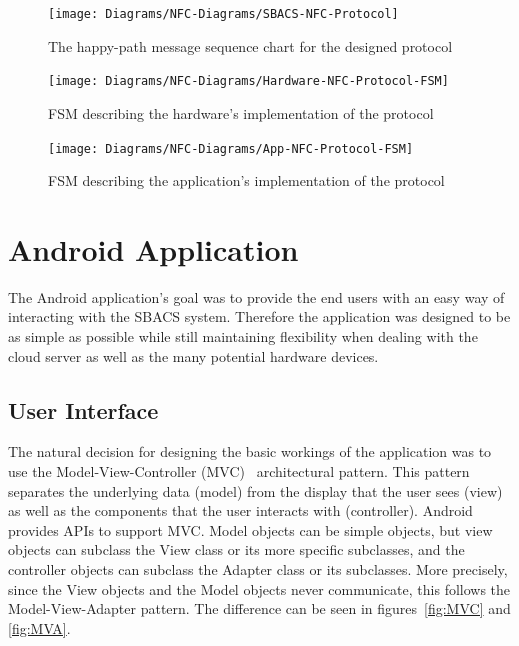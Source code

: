 \documentclass[12pt]{report}
\let\Oldsection\section
\renewcommand{\section}{\FloatBarrier\Oldsection}
\let\Oldsubsection\subsection
\renewcommand{\subsection}{\FloatBarrier\Oldsubsection}
\begin{document}
\begin{figure}
    \centering
    \texttt{[image: Diagrams/NFC-Diagrams/SBACS-NFC-Protocol]}
    \caption{The happy-path message sequence chart for the designed protocol}
    \label{fig:nfc-protocol-msc}
\end{figure}

\begin{figure}
    \texttt{[image: Diagrams/NFC-Diagrams/Hardware-NFC-Protocol-FSM]}
    \caption{FSM describing the hardware's implementation of the protocol}
    \label{fig:nfc-protocol-fsm-hw}
\end{figure}

\begin{figure}
    \texttt{[image: Diagrams/NFC-Diagrams/App-NFC-Protocol-FSM]}
    \caption{FSM describing the application's implementation of the protocol}
    \label{fig:nfc-protocol-fsm-app}
\end{figure}


\section{Android Application} \label{android-application}

The Android application's goal was to provide the end users with an easy way of interacting with the SBACS system.
Therefore the application was designed to be as simple as possible while still maintaining flexibility when dealing with
the cloud server as well as the many potential hardware devices.


\subsection{User Interface} \label{user-interface}

The natural decision for designing the basic workings of the application was to use the Model-View-Controller (MVC)~\autocite{MVC} 
architectural pattern. This pattern separates the underlying data (model) from the display that the user sees (view) as well as
the components that the user interacts with (controller). Android provides APIs to support MVC. Model objects can be
simple objects, but view objects can subclass the View class or its more specific subclasses, and the controller
objects can subclass the Adapter class or its subclasses. More precisely, since the View objects and the Model objects
never communicate, this follows the Model-View-Adapter pattern. The difference can be seen in figures~\ref{fig:MVC} and
\ref{fig:MVA}.
\end{document}
